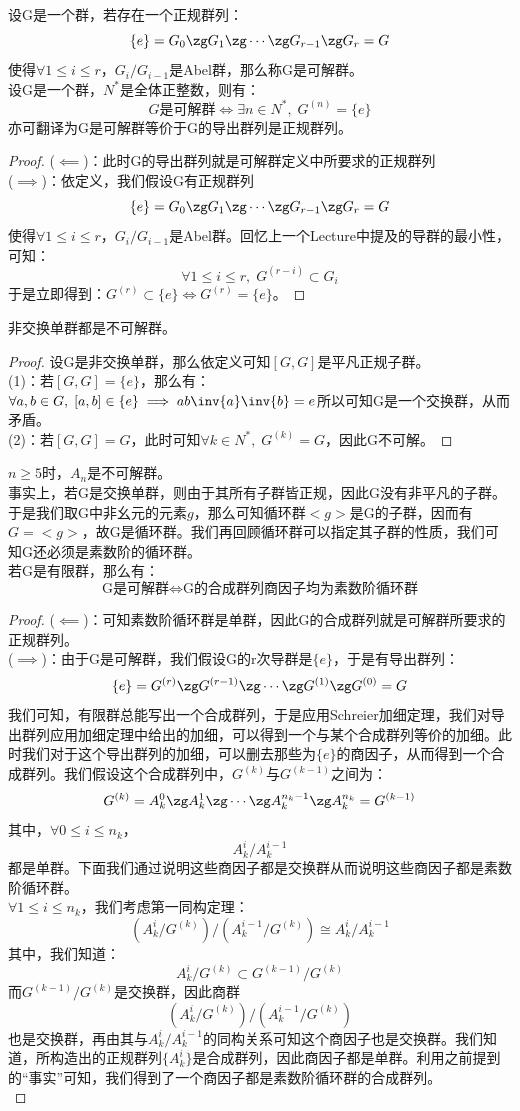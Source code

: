 设G是一个群，若存在一个正规群列：
\[
\{e\}=G_0\zg G_1\zg \cdots \zg G_{r-1}\zg G_r=G
\]
使得$\forall 1\leq i\leq r$，$G_i/G_{i-1}$是Abel群，那么称G是可解群。\\
设G是一个群，$N^*$是全体正整数，则有：
\[
G\text{是可解群}\iff \exists n\in N^*,\; G^{(n)}=\{e\}
\]
亦可翻译为G是可解群等价于G的导出群列是正规群列。
\begin{proof}
($\impliedby$)：此时G的导出群列就是可解群定义中所要求的正规群列\\
($\implies$)：依定义，我们假设G有正规群列
\[
\{e\}=G_0\zg G_1\zg \cdots \zg G_{r-1}\zg G_r=G
\]
使得$\forall 1\leq i\leq r$，$G_i/G_{i-1}$是Abel群。回忆上一个Lecture中提及的导群的最小性，可知：
\[
\forall 1\leq i\leq r,\; G^{(r-i)}\subset G_i
\]
于是立即得到：$G^{(r)}\subset\{e\}\iff G^{(r)}=\{e\}$。
\end{proof}
非交换单群都是不可解群。
\begin{proof}
设G是非交换单群，那么依定义可知$[G,G]$是平凡正规子群。\\
(1)：若$[G,G]=\{e\}$，那么有：$\forall a,b\in G,\; [a,b]\in \{e\}\implies ab\inv{a}\inv{b}=e$所以可知G是一个交换群，从而矛盾。\\
(2)：若$[G,G]=G$，此时可知$\forall k\in N^*,\; G^{(k)}=G$，因此G不可解。
\end{proof}
$n\geq 5$时，$A_n$是不可解群。\\
事实上，若G是交换单群，则由于其所有子群皆正规，因此G没有非平凡的子群。于是我们取G中非幺元的元素$g$，那么可知循环群$<g>$是G的子群，因而有$G=<g>$，故G是循环群。我们再回顾循环群可以指定其子群的性质，我们可知G还必须是素数阶的循环群。\\
若G是有限群，那么有：
\[
\text{G是可解群}\iff\text{G的合成群列商因子均为素数阶循环群}
\]
\begin{proof}
($\impliedby$)：可知素数阶循环群是单群，因此G的合成群列就是可解群所要求的正规群列。\\
($\implies$)：由于G是可解群，我们假设G的r次导群是$\{e\}$，于是有导出群列：
\[
\{e\}=G^{(r)}\zg G^{(r-1)}\zg \cdots \zg G^{(1)}\zg G^{(0)}=G
\]
我们可知，有限群总能写出一个合成群列，于是应用Schreier加细定理，我们对导出群列应用加细定理中给出的加细，可以得到一个与某个合成群列等价的加细。此时我们对于这个导出群列的加细，可以删去那些为$\{e\}$的商因子，从而得到一个合成群列。我们假设这个合成群列中，$G^{(k)}$与$G^{(k-1)}$之间为：
\[
G^{(k)}=A_k^0\zg A_k^1\zg\cdots \zg A_k^{n_k-1}\zg A_k^{n_k}=G^{(k-1)}
\]
其中，$\forall 0\leq i\leq n_k$，
\[
A_k^{i}/A_k^{i-1}
\]
都是单群。下面我们通过说明这些商因子都是交换群从而说明这些商因子都是素数阶循环群。\\
$\forall 1\leq i\leq n_k$，我们考虑第一同构定理：
\[
(A_k^{i}/G^{(k)})/(A_k^{i-1}/G^{(k)})\cong A_k^{i}/A_k^{i-1}
\]
其中，我们知道：
\[
A_k^{i}/G^{(k)}\subset G^{(k-1)}/G^{(k)}
\]
而$G^{(k-1)}/G^{(k)}$是交换群，因此商群
\[
(A_k^{i}/G^{(k)})/(A_k^{i-1}/G^{(k)})
\]
也是交换群，再由其与$A_k^{i}/A_k^{i-1}$的同构关系可知这个商因子也是交换群。我们知道，所构造出的正规群列$\{A_k^i\}$是合成群列，因此商因子都是单群。利用之前提到的“事实”可知，我们得到了一个商因子都是素数阶循环群的合成群列。\\
\end{proof}
